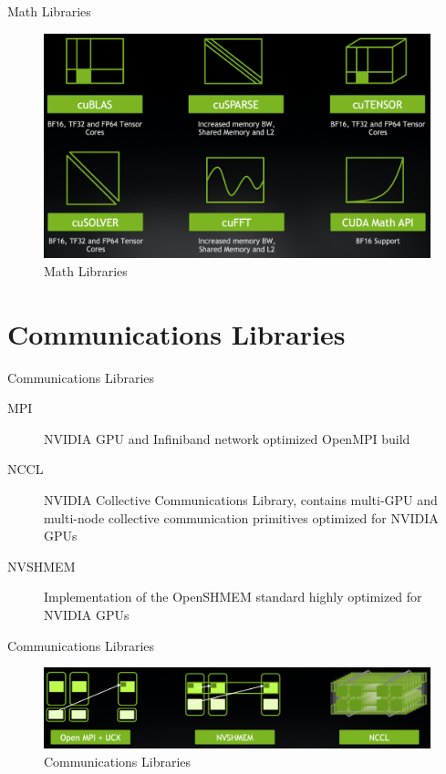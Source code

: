 \documentclass[aspectratio=169]{beamer}
\begin{document}
\begin{frame}{Math Libraries}
\begin{figure}
  \includegraphics[height=0.75\textheight]{figures/libraries.png}
  \caption{Math Libraries}
\end{figure}
\end{frame}

\section{Communications Libraries}

\begin{frame}{Communications Libraries}
\begin{description}
  \item[MPI] NVIDIA GPU and Infiniband network optimized OpenMPI build
  \item[NCCL] NVIDIA Collective Communications Library, contains multi-GPU and multi-node collective communication primitives optimized for NVIDIA GPUs
  \item[NVSHMEM] Implementation of the OpenSHMEM standard highly optimized for NVIDIA GPUs
\end{description}
\end{frame}

\begin{frame}{Communications Libraries}
\begin{figure}
  \includegraphics[width=\linewidth]{figures/comm.png}
  \caption{Communications Libraries}
\end{figure}
\end{frame}
\end{document}
